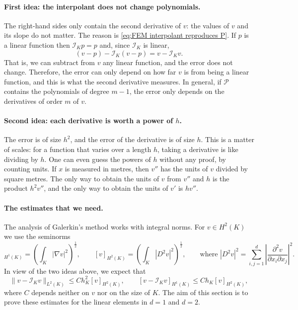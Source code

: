\paragraph{First idea: the interpolant does not change polynomials.}
The right-hand sides only contain the second derivative of $v$: the values of $v$ and its slope do not matter.
The reason is \eqref{eq:FEM interpolant reproduces P}. If $p$ is a linear function then $\mathcal I_K p = p$ and, since $\mathcal I_K$ is linear,
\begin{equation*}
    (v - p) - \mathcal I_K (v - p) = v - \mathcal I_K v.
\end{equation*}
That is, we can subtract from $v$ any linear function, and the error does not change.
Therefore, the error can only depend on how far $v$ is from being a linear function, and this is what the second derivative measures.
In general, if $\mathcal P$ contains the polynomials of degree $m-1$, the error only depends on the derivatives of order $m$ of $v$.

\paragraph{Second idea: each derivative is worth a power of $h$.}
The error is of size $h^2$, and the error of the derivative is of size $h$.
This is a matter of scales: for a function that varies over a length $h$, taking a derivative is like dividing by $h$.
One can even guess the powers of $h$ without any proof, by counting units.
If $x$ is measured in metres, then $v''$ has the units of $v$ divided by square metres.
The only way to obtain the units of $v$ from $v''$ and $h$ is the product $h^2 v''$, and the only way to obtain the units of $v'$ is $h v''$.

\paragraph{The estimates that we need.}
The analysis of Galerkin's method works with integral norms. For $v \in H^2(K)$ we use the seminorms
\begin{equation*}
    [v]_{H^1(K)} = \left( \int_K |\nabla v|^2 \right)^{\frac 1 2},
    \qquad
    [v]_{H^2(K)} = \left( \int_K |D^2 v|^2 \right)^{\frac 1 2},
    \qquad \text{where }
    |D^2 v|^2 = \sum_{i,j=1}^d \left| \frac{\partial^2 v}{\partial x_i \partial x_j} \right|^2 .
\end{equation*}
In view of the two ideas above, we expect that
\begin{equation}
    \label{eq:FEM local error expected}
    \| v - \mathcal I_K v \|_{L^2(K)} \le C h_K^2 [v]_{H^2(K)},
    \qquad
    [ v - \mathcal I_K v ]_{H^1(K)} \le C h_K [v]_{H^2(K)},
\end{equation}
where $C$ depends neither on $v$ nor on the size of $K$.
The aim of this section is to prove these estimates for the linear elements in $d = 1$ and $d = 2$.

